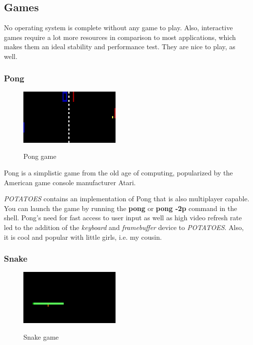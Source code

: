 \documentclass[11pt,a4paper]{scrartcl}
\begin{document}
\subsection{Games}

No operating system is complete without any game to play. Also, interactive games require a lot more resources in comparison to most applications, which makes them an ideal stability and performance test. They are nice to play, as well.

\subsubsection{Pong}

\begin{figure}
\centering
{\includegraphics[width=5cm]{pong.png}}
\caption {Pong game}
\end{figure}

Pong is a simplistic game from the old age of computing, popularized by the American game console manufacturer Atari. 

\textit{POTATOES} contains an implementation of Pong that is also multiplayer capable. You can launch the game by running the \textbf{pong} or \textbf{pong -2p} command in the shell.
Pong's need for fast access to user input as well as high video refresh rate led to the addition of the \textit{keyboard} and \textit{framebuffer} device to \textit{POTATOES}. Also, it is cool and popular with little girls, i.e. my cousin.

\subsubsection{Snake}

\begin{figure}
\centering
{\includegraphics[width=5cm]{snake.png}}
\caption {Snake game}
\end{figure}
\end{document}
